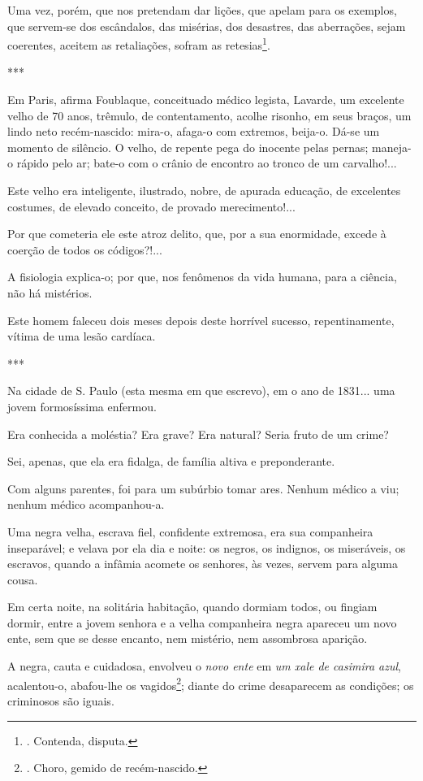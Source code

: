 Uma vez, porém, que nos pretendam dar lições, que apelam para os
exemplos, que servem-se dos escândalos, das misérias, dos desastres, das
aberrações, sejam coerentes, aceitem as retaliações, sofram as
retesias\footnote{. Contenda, disputa.}.

***

Em Paris, afirma Foublaque, conceituado médico legista, Lavarde, um
excelente velho de 70 anos, trêmulo, de contentamento, acolhe risonho,
em seus braços, um lindo neto recém-nascido: mira-o, afaga-o com
extremos, beija-o. Dá-se um momento de silêncio. O velho, de repente
pega do inocente pelas pernas; maneja-o rápido pelo ar; bate-o com o
crânio de encontro ao tronco de um carvalho!...

Este velho era inteligente, ilustrado, nobre, de apurada educação, de
excelentes costumes, de elevado conceito, de provado merecimento!...

Por que cometeria ele este atroz delito, que, por a sua enormidade,
excede à coerção de todos os códigos?!...

A fisiologia explica-o; por que, nos fenômenos da vida humana, para a
ciência, não há mistérios.

Este homem faleceu dois meses depois deste horrível sucesso,
repentinamente, vítima de uma lesão cardíaca.

***

Na cidade de S. Paulo (esta mesma em que escrevo), em o ano de 1831...
uma jovem formosíssima enfermou.

Era conhecida a moléstia? Era grave? Era natural? Seria fruto de um
crime?

Sei, apenas, que ela era fidalga, de família altiva e preponderante.

Com alguns parentes, foi para um subúrbio tomar ares. Nenhum médico a
viu; nenhum médico acompanhou-a.

Uma negra velha, escrava fiel, confidente extremosa, era sua companheira
inseparável; e velava por ela dia e noite: os negros, os indignos, os
miseráveis, os escravos, quando a infâmia acomete os senhores, às vezes,
servem para alguma cousa.

Em certa noite, na solitária habitação, quando dormiam todos, ou fingiam
dormir, entre a jovem senhora e a velha companheira negra apareceu um
novo ente, sem que se desse encanto, nem mistério, nem assombrosa
aparição.

A negra, cauta e cuidadosa, envolveu o \emph{novo ente} em \emph{um xale
de casimira azul}, acalentou-o, abafou-lhe os vagidos\footnote{. Choro,
  gemido de recém-nascido.}; diante do crime desaparecem as condições;
os criminosos são iguais.

